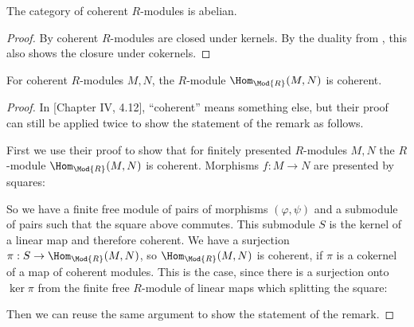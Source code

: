 \begin{theorem}
   The category of coherent $R$-modules is abelian.
\end{theorem}

\begin{proof}
  By  coherent $R$-modules are closed under kernels.
  By the duality from , this also shows the closure under cokernels.
\end{proof}

\begin{remark}
  \label{hom-closure}
  For coherent $R$-modules $M,N$, the $R$-module $\Hom_{\Mod{R}}(M,N)$ is coherent.
\end{remark}

\begin{proof}
  In \cite{lombardi-quitte}[Chapter IV, 4.12], ``coherent'' means something else, but their proof can still be applied twice to show the statement of the remark as follows.
  
  First we use their proof to show that for finitely presented $R$-modules $M,N$ the $R$-module $\Hom_{\Mod{R}}(M,N)$ is coherent. Morphisms $f:M\to N$ are presented by squares:
  \begin{center}
\end{center}
  So we have a finite free module of pairs of morphisms $(\varphi,\psi)$ and a submodule of pairs such that the square above commutes.
  This submodule $S$ is the kernel of a linear map and therefore coherent.
  We have a surjection $\pi:S\to \Hom_{\Mod{R}}(M,N)$, so $\Hom_{\Mod{R}}(M,N)$ is coherent,
  if $\pi$ is a cokernel of a map of coherent modules.
  This is the case, since there is a surjection onto $\ker{\pi}$ from the finite free $R$-module of linear maps which splitting the square:
  \begin{center}
\end{center}
  Then we can reuse the same argument to show the statement of the remark.
\end{proof}

